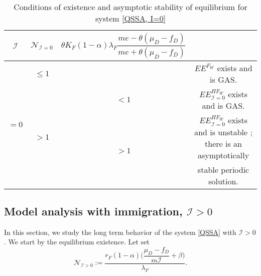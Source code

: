 \documentclass{article}
\newcommand{\lfw}{\lambda_{F}}
\newcommand{\lfw}{\lambda_{F}}
\newcommand{\cI}{\mathcal{I}}
\newcommand{\N}{\mathcal{N}}
\begin{document}
\begin{table}[!ht]
\centering
\def\arraystretch{2}
\begin{tabular}{c|c|c|c}
$\cI$ & $\N_{\cI=0}$ &  $\theta K_F(1-\alpha) \lfw \dfrac{me - \theta (\mu_D - f_D)}{me + \theta(\mu_D - f_D)}$ & \\
\hline
\multirow{4}{*}{$=0$} & $ \leq 1$ & &$EE^{F_W}$ exists and is GAS.  \\
\cline{2-4}
 & \multirow{3}{*}{$> 1$} & $<1$ &$EE^{HF_W}_{\cI=0}$ exists and is GAS.\\
 \cline{3-4}
 & & \multirow{2}{*}{$ > 1$} & $EE^{HF_W}_{\cI=0}$ exists and is unstable ; there is an asymptotically \\
 & & &  stable periodic solution.
\end{tabular}
\caption{\centering Conditions of existence and asymptotic stability of equilibrium for system \eqref{QSSA, I=0}}
\end{table}

\newpage 
\subsection{Model analysis with immigration, $\cI > 0$}

In this section, we study the long term behavior of the system \eqref{QSSA} with $\cI > 0$. We start by the equilibrium existence. Let set
\begin{equation}
\mathcal{N}_{\cI > 0}:= \dfrac{r_F(1-\alpha)\Big({\dfrac{\mu_D - f_D}{m\cI}+\beta\Big)}}{\lfw}.
\label{N_Igt0}
\end{equation}
\end{document}
